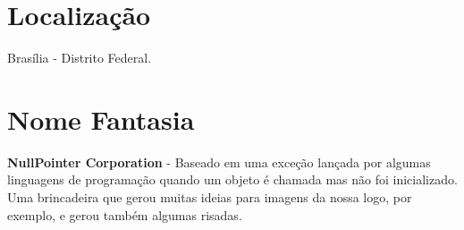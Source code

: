 \documentclass[11pt]{article}
\begin{document}
\section{Localização}
 Brasília - Distrito Federal.
 
\section{Nome Fantasia}
 \textbf{NullPointer Corporation} - Baseado em uma exceção lançada por algumas
 linguagens de programação quando um objeto é chamada mas não foi inicializado.
 Uma brincadeira que gerou muitas ideias para imagens da nossa logo, por exemplo,
 e gerou também algumas risadas.
\end{document}
